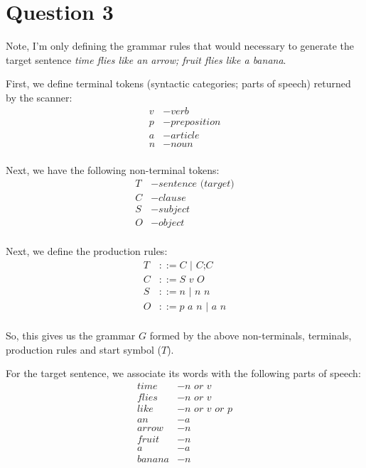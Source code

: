 \documentclass{article}
\begin{document}
    \section*{Question 3}
    Note, I'm only defining the grammar rules that would necessary to generate the target sentence \textit{time flies like an arrow; fruit flies like a banana}.

    First, we define terminal tokens (syntactic categories; parts of speech) returned by the scanner:
    \begin{align*}
        v & - \textit{verb} \\
        p & - \textit{preposition} \\
        a & - \textit{article} \\
        n & - \textit{noun} \\
    \end{align*}

    Next, we have the following non-terminal tokens:
    \begin{align*}
        T & - \textit{sentence (target)} \\
        C & - \textit{clause} \\
        S & - \textit{subject} \\
        O & - \textit{object} \\
    \end{align*}

    Next, we define the production rules:
    \begin{align*}
        T   & ::= \textit{C } | \textit{ C;C} \\
        C   & ::= \textit{S v O} \\
        S   & ::= \textit{n } | \textit{ n n} \\
        O   & ::= \textit{p a n } | \textit{ a n} \\
    \end{align*}

    So, this gives us the grammar $G$ formed by the above non-terminals, terminals, production rules and start symbol ($T$).

    For the target sentence, we associate its words with the following parts of speech:
    \begin{align*}
        time    & - \textit{n or v} \\
        flies   & - \textit{n or v}\\
        like    & - \textit{n or v or p} \\
        an      & - \textit{a} \\
        arrow   & - \textit{n} \\
        fruit   & - \textit{n} \\
        a       & - \textit{a} \\
        banana  & - \textit{n} \\
    \end{align*}
\end{document}

